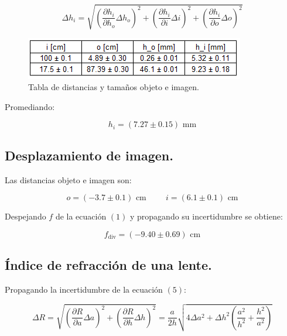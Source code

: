 \documentclass[DIV=calc, paper=a4, fontsize=10pt]{scrartcl}
\begin{document}
\begin{equation*}
    \Delta h_i = \sqrt{\left(\frac{\partial h_i}{\partial h_o} \Delta h_o\right)^{2} + \left(\frac{\partial h_i}{\partial i}\Delta i\right)^{2} + \left(\frac{\partial h_i}{\partial o}\Delta o\right)^{2}}
\end{equation*}

\begin{figure}[H]
    \centering
    \includegraphics[scale=1]{tablas/tabla bessel.PNG}
    \caption{Tabla de distancias y tamaños objeto e imagen.}
\end{figure}

Promediando:

\begin{equation*}
    h_i = (7.27 \pm 0.15) \text{ mm}
\end{equation*}



\subsection*{\textcolor{carmine}{Desplazamiento de imagen.}}

Las distancias objeto e imagen son:

\begin{equation*}
    o = (-3.7 \pm 0.1) \text{ cm} \hspace{1cm} i = (6.1 \pm 0.1) \text{ cm}
\end{equation*}

Despejando $f$ de la ecuación $(1)$ y propagando su incertidumbre se obtiene:

\begin{equation*}
    f_{\text{div}} = (-9.40 \pm 0.69) \text{ cm}
\end{equation*}






\subsection*{\textcolor{carmine}{Índice de refracción de una lente.}}

Propagando la incertidumbre de la ecuación $(5)$:

\begin{equation*}
    \Delta R = \sqrt{\left(\frac{\partial R}{\partial a}\Delta a\right)^{2} + \left(\frac{\partial R}{\partial h} \Delta h\right)^{2}} =\frac{a}{2h} \sqrt{4\Delta a^2 + \Delta h^2 \left(\frac{a^2}{h^2} + \frac{h^2}{a^2}\right) }
\end{equation*}
\end{document}
